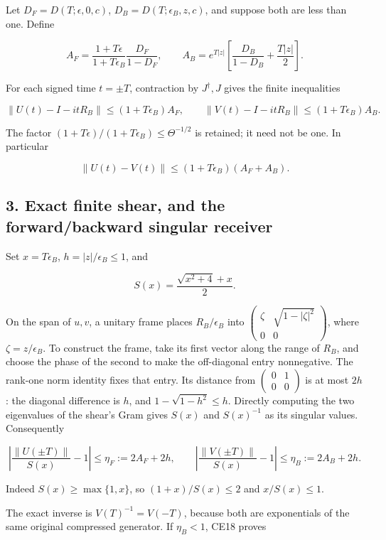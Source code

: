 \documentclass[10pt]{article}
\begin{document}
Let \(D_F=D(T;\epsilon,0,c)\), \(D_B=D(T;\epsilon_B,z,c)\), and suppose both are less than one. Define

\[
A_F=\frac{1+T\epsilon}{1+T\epsilon_B}\frac{D_F}{1-D_F},\qquad
A_B=e^{T|z|}\left[\frac{D_B}{1-D_B}+\frac{T|z|}{2}\right]. \tag{CE14}
\]

For each signed time \(t=\pm T\), contraction by \(J^\dagger,J\) gives the finite inequalities

\[
\|U(t)-I-itR_B\|\le(1+T\epsilon_B)A_F,\qquad
\|V(t)-I-itR_B\|\le(1+T\epsilon_B)A_B. \tag{CE15}
\]

The factor \((1+T\epsilon)/(1+T\epsilon_B)\le\Theta^{-1/2}\) is retained; it need not be one. In particular

\[
\|U(t)-V(t)\|\le(1+T\epsilon_B)(A_F+A_B). \tag{CE16}
\]

\subsection{3. Exact finite shear, and the forward/backward singular receiver}\label{exact-finite-shear-and-the-forwardbackward-singular-receiver}

Set \(x=T\epsilon_B\), \(h=|z|/\epsilon_B\le1\), and

\[
S(x)=\frac{\sqrt{x^2+4}+x}{2}. \tag{CE17}
\]

On the span of \(u,v\), a unitary frame places \(R_B/\epsilon_B\) into \(\begin{pmatrix}\zeta&\sqrt{1-|\zeta|^2}\\0&0\end{pmatrix}\), where \(\zeta=z/\epsilon_B\). To construct the frame, take its first vector along the range of \(R_B\), and choose the phase of the second to make the off-diagonal entry nonnegative. The rank-one norm identity fixes that entry. Its distance from \(\begin{pmatrix}0&1\\0&0\end{pmatrix}\) is at most \(2h\): the diagonal difference is \(h\), and \(1-\sqrt{1-h^2}\le h\). Directly computing the two eigenvalues of the shear's Gram gives \(S(x)\) and \(S(x)^{-1}\) as its singular values. Consequently

\[
\left|\frac{\|U(\pm T)\|}{S(x)}-1\right|\le\eta_F:=2A_F+2h,
\qquad
\left|\frac{\|V(\pm T)\|}{S(x)}-1\right|\le\eta_B:=2A_B+2h. \tag{CE18}
\]

Indeed \(S(x)\ge\max\{1,x\}\), so \((1+x)/S(x)\le2\) and \(x/S(x)\le1\).

The exact inverse is \(V(T)^{-1}=V(-T)\), because both are exponentials of the same original compressed generator. If \(\eta_B<1\), CE18 proves
\end{document}
